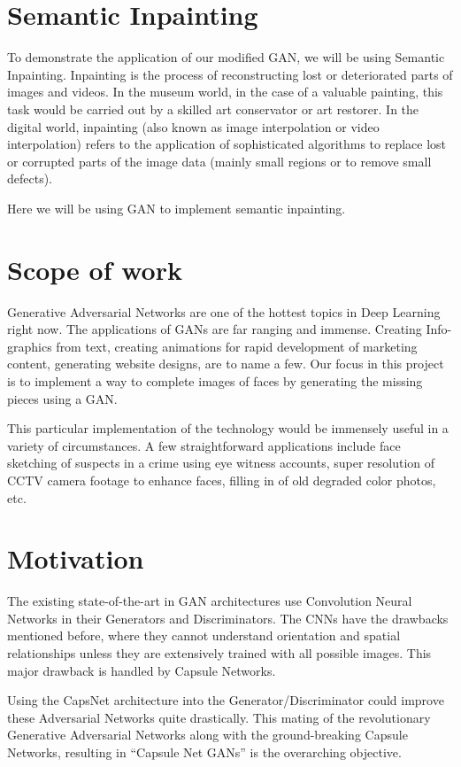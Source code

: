 \section{Semantic Inpainting} %
\label{sec:semantic_inpainting}
To demonstrate the application of our modified GAN, we will be using Semantic Inpainting. Inpainting is the process of reconstructing lost or deteriorated parts of images and videos. In the museum world, in the case of a valuable painting, this task would be carried out by a skilled art conservator or art restorer. In the digital world, inpainting (also known as image interpolation or video interpolation) refers to the application of sophisticated algorithms to replace lost or corrupted parts of the image data (mainly small regions or to remove small defects). 
\par\bigskip
Here we will be using GAN to implement semantic inpainting.

\section{Scope of work} %
\label{sec:scope_of_work}
Generative Adversarial Networks are one of the hottest topics in Deep Learning right now. The applications of GANs are far ranging and immense. Creating Info-graphics from text, creating animations for rapid development of marketing content, generating website designs, are to name a few. Our focus in this project is to implement a way to complete images of faces by generating the missing pieces using a GAN. 

\par\bigskip
This particular implementation of the technology would be immensely useful in a variety of circumstances. A few straightforward applications include face sketching of suspects in a crime using eye witness accounts, super resolution of CCTV camera footage to enhance faces, filling in of old degraded color photos, etc.

\section{Motivation} %
\label{sec:motivation}
The existing state-of-the-art in GAN architectures use Convolution Neural Networks in their Generators and Discriminators. The CNNs have the drawbacks mentioned before, where they cannot understand orientation and spatial relationships unless they are extensively trained with all possible images. This major drawback is handled by Capsule Networks.\par\bigskip
Using the CapsNet architecture into the Generator/Discriminator could improve these Adversarial Networks quite drastically. This mating of the revolutionary Generative Adversarial Networks along with the ground-breaking Capsule Networks, resulting in “Capsule Net GANs” is the overarching objective.
